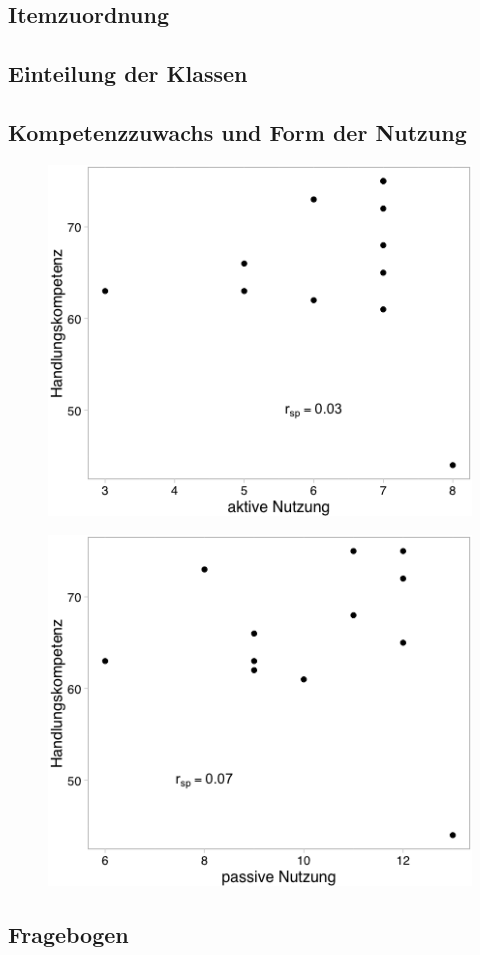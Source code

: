 \documentclass[12pt,smallheadings, bibliography=totoc]{scrartcl}
\begin{document}
  \subsection{Itemzuordnung}
  \label{sec:item}
  
  \subsection{Einteilung der Klassen}
  \label{sec:klasse}
  
  \subsection{Kompetenzzuwachs und Form der Nutzung}
  \label{sec:aktiv}
  \begin{figure}[H]
\includegraphics[width=0.4\linewidth]{Anhang/spearaneu.png}
\end{figure}
\begin{figure}[H]
\includegraphics[width=0.4\linewidth]{Anhang/spearpneu.png}
\end{figure}
\subsection{Fragebogen}
\label{sec:fragen}
\end{document}
